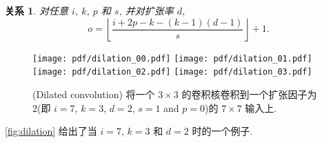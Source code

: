 \documentclass[notitlepage]{ctexrep}
\newtheorem{relationship}{关系}
\begin{document}
\begin{relationship}\label{rel:dilation}
对任意 $i$, $k$, $p$ 和 $s$, 并对扩张率 $d$,
\begin{equation*}
    o = \left\lfloor \frac{i + 2p - k - (k - 1)(d - 1)}{s} \right\rfloor + 1.
\end{equation*}
\end{relationship}

\begin{figure}[h]
    \centering
    \texttt{[image: pdf/dilation\_00.pdf]}
    \texttt{[image: pdf/dilation\_01.pdf]}
    \texttt{[image: pdf/dilation\_02.pdf]}
    \texttt{[image: pdf/dilation\_03.pdf]}
    \caption{\label{fig:dilation} (Dilated convolution)
    将一个 $3 \times 3$ 的卷积核卷积到一个扩张因子为2(即 $i = 7$, $k = 3$, $d = 2$, $s = 1$ and $p = 0$)的 $7 \times 7$ 输入上.}
\end{figure}

\noindent \autoref{fig:dilation} 给出了当 $i = 7$, $k = 3$ 和
$d = 2$ 时的一个例子.



\end{document}
